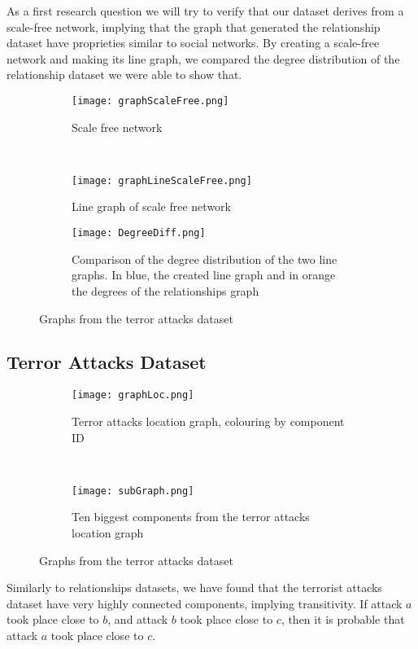 As a first research question we will try to verify that our dataset derives from a scale-free network, implying that the graph that generated the relationship dataset have proprieties similar to social networks.
By creating a scale-free network and making its line graph, we compared the degree distribution of the relationship dataset we were able to show that.

\begin{figure}[H]
\begin{center}
    \begin{subfigure}[b]{0.45\textwidth}
        \texttt{[image: graphScaleFree.png]}
        \caption{Scale free network}
        \label{fig:Scalefree}
    \end{subfigure}
    ~
    \begin{subfigure}[b]{0.45\textwidth}
        \texttt{[image: graphLineScaleFree.png]}
        \caption{Line graph of scale free network}
        \label{fig:lineG}
    \end{subfigure}
    
    \begin{subfigure}[b]{\textwidth}
    	\begin{centering}
        \texttt{[image: DegreeDiff.png]}
        \caption{\centering Comparison of the degree distribution of the two line graphs. In blue, the created line graph and in orange the degrees of the relationships graph}
        \label{fig:DegDiff}
        \end{centering}
    \end{subfigure}
\caption{Graphs from the terror attacks dataset}
\label{fig:RelationshipScaleFree}
\end{center}
\end{figure}


\subsection{Terror Attacks Dataset}
\label{subsec:Terror Attacks Dataset}

\begin{figure}[H]
\begin{center}
    \begin{subfigure}[b]{0.45\textwidth}
        \texttt{[image: graphLoc.png]}
        \caption{Terror attacks location graph, colouring by component ID}
        \label{fig:graphLoc}
    \end{subfigure}
    ~
    \begin{subfigure}[b]{0.45\textwidth}
        \texttt{[image: subGraph.png]}
        \caption{Ten biggest components from the terror attacks location graph}
        \label{fig:subGraph}
    \end{subfigure}
\caption{Graphs from the terror attacks dataset}
\label{fig:graphPlots}
\end{center}
\end{figure}

Similarly to relationships datasets, we have found that the terrorist attacks dataset have very highly connected components, implying transitivity. 
If attack $a$ took place close to $b$, and attack $b$ took place close to $c$, then it is probable that attack $a$ took place close to $c$.

